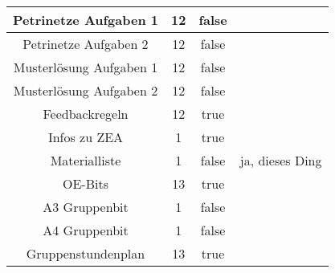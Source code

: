 \documentclass[10pt,a4paper,oneside,ngerman,numbers=noenddot]{scrartcl}
\begin{document}
\begin{table}[ht]
\begin{tabular}{c|c|c|c}
		\hline
		Petrinetze Aufgaben 1 & 12 & false & \\
		\hline
		Petrinetze Aufgaben 2 & 12 & false & \\
		\hline
		Musterlösung Aufgaben 1 & 12 & false & \\
		\hline
		Musterlösung Aufgaben 2 & 12 & false & \\
		\hline
		Feedbackregeln & 12 & true & \\
		\hline
		Infos zu ZEA & 1 & true & \\
		\hline
		Materialliste & 1 & false & ja, dieses Ding \\
		\hline
		OE-Bits & 13 & true & \\
		\hline
		A3 Gruppenbit & 1 & false & \\
		\hline
		A4 Gruppenbit & 1 & false & \\
		\hline
		Gruppenstundenplan & 13 & true &
	\end{tabular}
\end{table}
\end{document}
